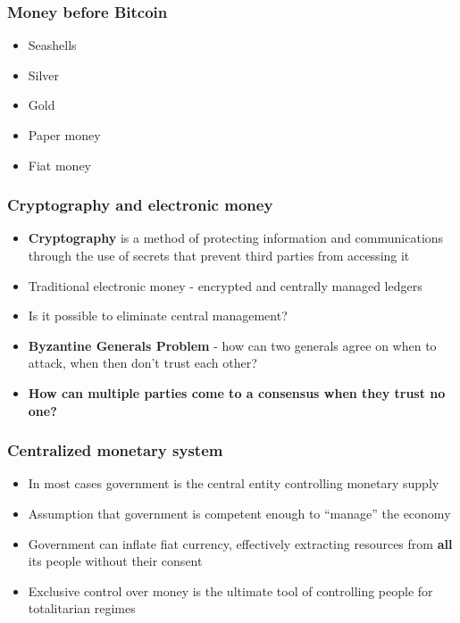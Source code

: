 \documentclass{beamer}
\begin{document}
\begin{frame}
  \frametitle{Money before Bitcoin}
  \begin{itemize}
  \item Seashells
  \item Silver
  \item Gold
  \item Paper money
  \item Fiat money
  \end{itemize}
\end{frame}

\begin{frame}
  \frametitle{Cryptography and electronic money}
  \begin{itemize}
  \item \textbf{Cryptography} is a method of protecting information and
    communications through the use of secrets that prevent third parties from
    accessing it
  \item Traditional electronic money - encrypted and centrally managed ledgers
  \item Is it possible to eliminate central management?
  \item \textbf{Byzantine Generals Problem} - how can two generals agree on when
    to attack, when then don't trust each other?
  \item \textbf{How can multiple parties come to a consensus when they trust no
      one?}
  \end{itemize}
\end{frame}

\begin{frame}
  \frametitle{Centralized monetary system}
  \begin{itemize}
  \item In most cases government is the central entity controlling monetary
    supply
  \item Assumption that government is competent enough to ``manage'' the economy
  \item Government can inflate fiat currency, effectively extracting resources
    from \textbf{all} its people without their consent
  \item Exclusive control over money is the ultimate tool of controlling people
    for totalitarian regimes
  \end{itemize}
\end{frame}
\end{document}
